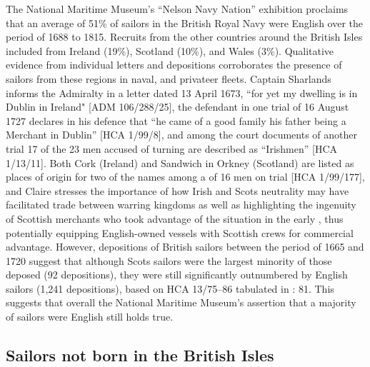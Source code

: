 The National Maritime Museum’s “Nelson Navy Nation” exhibition proclaims that an average of 51\% of sailors in the British Royal Navy were English over the period of 1688 to 1815. Recruits from the other countries around the British Isles included  from Ireland (19\%), Scotland (10\%), and Wales (3\%). Qualitative evidence from individual letters and depositions corroborates the presence of sailors from these regions in naval,  and privateer fleets. Captain Sharlands informs the Admiralty in a letter dated 13 April {1673}, “for yet my dwelling is in Dublin in Ireland" [ADM 106/288/25], the defendant in one trial of 16 August {1727} declares in his defence that “he came of a good family his father being a Merchant in Dublin” [HCA 1/99/8], and among the court documents of another trial 17 of the 23 men accused of turning  are described as “Irishmen” [HCA 1/13/11]. Both Cork (Ireland) and Sandwich in Orkney (Scotland) are listed as places of origin for two of the names among a  of 16 men on trial [HCA 1/99/177], and Claire \citet{McLoughlin2013} stresses the importance of how Irish and Scots neutrality may have facilitated trade between warring kingdoms as well as highlighting the ingenuity of Scottish merchants who took advantage of the situation in the early , thus potentially equipping English-owned vessels with Scottish crews for commercial advantage. However, depositions of British sailors between the period of 1665 and 1720 suggest that although Scots sailors were the largest minority of those deposed (92 depositions), they were still significantly outnumbered by English sailors (1,241 depositions), based on HCA 13/75–86 tabulated in \citealt{Earle1993}: 81. This suggests that overall the National Maritime Museum’s assertion that a majority of sailors were English still holds true.  

\subsection{{Sailors not born in the British Isles}}\label{sec:3.9.3}

